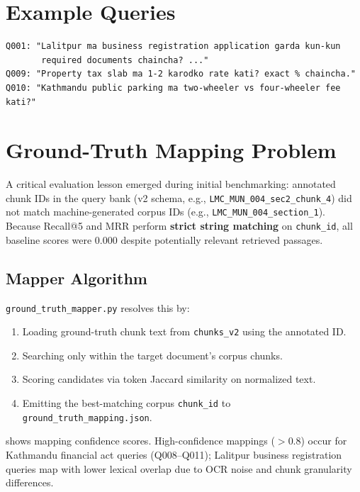 \section{Example Queries}
\begin{lstlisting}[language={},caption={Example code-switched queries from the research bank.},label={lst:queries}]
Q001: "Lalitpur ma business registration application garda kun-kun
       required documents chaincha? ..."
Q009: "Property tax slab ma 1-2 karodko rate kati? exact % chaincha."
Q010: "Kathmandu public parking ma two-wheeler vs four-wheeler fee kati?"
\end{lstlisting}

\section{Ground-Truth Mapping Problem}
A critical evaluation lesson emerged during initial benchmarking: annotated chunk IDs in the query bank (v2 schema, e.g., \texttt{LMC\_MUN\_004\_sec2\_chunk\_4}) did not match machine-generated corpus IDs (e.g., \texttt{LMC\_MUN\_004\_section\_1}). Because Recall@5 and MRR perform \textbf{strict string matching} on \texttt{chunk\_id}, all baseline scores were 0.000 despite potentially relevant retrieved passages.

\subsection{Mapper Algorithm}
\texttt{ground\_truth\_mapper.py} resolves this by:
\begin{enumerate}[leftmargin=*]
  \item Loading ground-truth chunk text from \texttt{chunks\_v2} using the annotated ID.
  \item Searching only within the target document's corpus chunks.
  \item Scoring candidates via token Jaccard similarity on normalized text.
  \item Emitting the best-matching corpus \texttt{chunk\_id} to \texttt{ground\_truth\_mapping.json}.
\end{enumerate}

 shows mapping confidence scores. High-confidence mappings ($>$0.8) occur for Kathmandu financial act queries (Q008--Q011); Lalitpur business registration queries map with lower lexical overlap due to OCR noise and chunk granularity differences.

